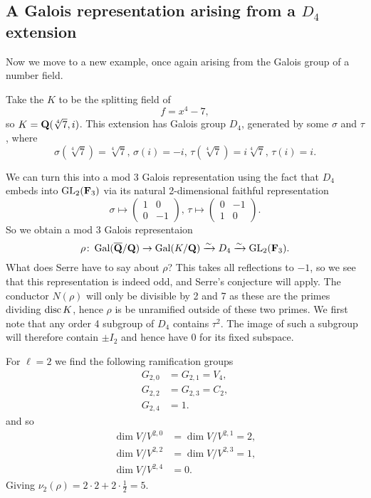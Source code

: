 \documentclass[a4paper,12pt]{article}
\begin{document}
\subsection{A Galois representation arising from a $D_4$ extension}
Now we move to a new example, once again arising from the Galois group of a number field.

\begin{ex}
Take the $K$ to be the splitting field of
\[
f = x^4 - 7,
\]
so $K = \mathbf{Q}(\sqrt[4]{7},i)$.
This extension has Galois group $D_4$, generated by some $\sigma$ and $\tau$, where
\[
\sigma(\sqrt[4]{7}) = \sqrt[4]{7},\,\sigma(i) = -i,\,
\tau(\sqrt[4]{7}) = i\sqrt[4]{7},\,\tau(i) = i.
\]

We can turn this into a mod 3 Galois representation using the fact that $D_4$ embeds into $\operatorname{GL}_2(\mathbf{F}_3)$ via its natural 2-dimensional faithful representation
\[
\sigma \mapsto \begin{pmatrix} 1 & 0 \\ 0 & -1 \end{pmatrix},\,
\tau \mapsto \begin{pmatrix} 0 & -1 \\ 1 & 0 \end{pmatrix}.
\]
So we obtain a mod $3$ Galois representaion
\[
\rho\colon \operatorname{Gal}(\overline{\mathbf{Q}}/\mathbf{Q}) \to \operatorname{Gal}(K/\mathbf{Q}) \xrightarrow{\sim} D_4  \xrightarrow{\sim} \operatorname{GL}_2(\mathbf{F}_3).
\]
What does Serre have to say about $\rho$?
This takes all reflections to $-1$, so we see that this representation is indeed odd, and Serre's conjecture will apply.
The conductor $N(\rho)$ will only be divisible by 2 and 7 as these are the primes dividing $\operatorname{disc} K$, hence $\rho$ is be unramified outside of these two primes.
We first note that any order 4 subgroup of $D_4$ contains $\tau^2$.
The image of such a subgroup will therefore contain $\pm I_2$ and hence have 0 for its fixed subspace.

For $\ell = 2$ we find the following ramification groups
\begin{align*}
G_{2,0}&= G_{2,1}= V_4,\\
G_{2,2}&= G_{2,3}= C_2,\\
G_{2,4}&= 1.
\end{align*}
and so
\begin{align*}
\dim V/V^{2,0} &= \dim V/V^{2,1} = 2,\\
\dim V/V^{2,2} &= \dim V/V^{2,3} = 1,\\
\dim V/V^{2,4} &= 0.
\end{align*}
Giving $\nu_2(\rho) = 2 \cdot 2 + 2\cdot\frac{1}{2} = 5$.


\end{ex}
\end{document}
